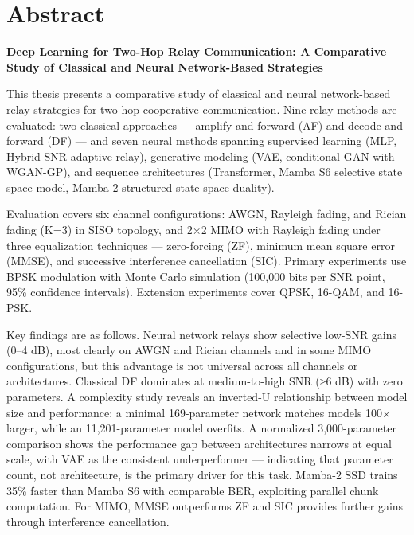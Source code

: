 \chapter*{Abstract}

\label{sec:abstract-english}


\textbf{Deep Learning for Two-Hop Relay Communication: A Comparative Study of Classical and Neural Network-Based Strategies}

This thesis presents a comparative study of classical and neural network-based relay strategies for two-hop cooperative communication. Nine relay methods are evaluated: two classical approaches --- amplify-and-forward (AF) and decode-and-forward (DF) --- and seven neural methods spanning supervised learning (MLP, Hybrid SNR-adaptive relay), generative modeling (VAE, conditional GAN with WGAN-GP), and sequence architectures (Transformer, Mamba S6 selective state space model, Mamba-2 structured state space duality).

Evaluation covers six channel configurations: AWGN, Rayleigh fading, and Rician fading (K=3) in SISO topology, and 2×2 MIMO with Rayleigh fading under three equalization techniques --- zero-forcing (ZF), minimum mean square error (MMSE), and successive interference cancellation (SIC). Primary experiments use BPSK modulation with Monte Carlo simulation (100,000 bits per SNR point, 95\% confidence intervals). Extension experiments cover QPSK, 16-QAM, and 16-PSK.

Key findings are as follows. Neural network relays show selective low-SNR gains (0--4 dB), most clearly on AWGN and Rician channels and in some MIMO configurations, but this advantage is not universal across all channels or architectures. Classical DF dominates at medium-to-high SNR (≥6 dB) with zero parameters. A complexity study reveals an inverted-U relationship between model size and performance: a minimal 169-parameter network matches models 100× larger, while an 11,201-parameter model overfits. A normalized 3,000-parameter comparison shows the performance gap between architectures narrows at equal scale, with VAE as the consistent underperformer --- indicating that parameter count, not architecture, is the primary driver for this task. Mamba-2 SSD trains 35\% faster than Mamba S6 with comparable BER, exploiting parallel chunk computation. For MIMO, MMSE outperforms ZF and SIC provides further gains through interference cancellation.

